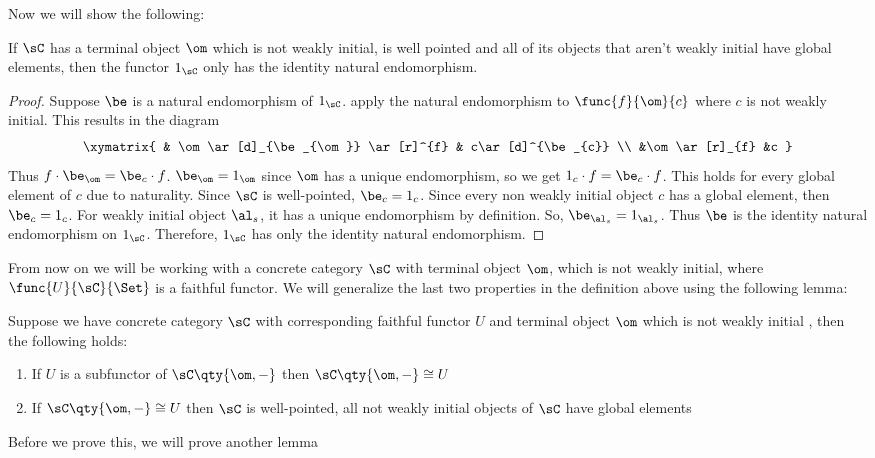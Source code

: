 \documentclass[main.tex]{subfiles}
\begin{document}
Now we will show the following:

\begin{lemma}
	If $\sC$ has a terminal object $\om$ which is not weakly initial, is well
	pointed and all of its  objects that aren't weakly initial have global
	elements, then the functor $1_{\sC}$ only has the identity natural
	endomorphism.
\end{lemma}

\begin{proof}
	Suppose $\be$ is a natural endomorphism of $1_{\sC}$. apply the natural
	endomorphism to $\func{f}{\om}{c}$ where $c$ is  not weakly initial. This
	results in the diagram $$\xymatrix{ & \om \ar[d]_{\be_{\om}} \ar[r]^{f} &
	c\ar[d]^{\be_{c}}  \\   &\om \ar[r]_{f} &c  } $$ Thus $f \cdot \be_{\om} =
	\be_{c} \cdot f$. $\be_{\om} = 1_{\om}$ since $\om$ has a unique
	endomorphism, so we get $1_{c} \cdot f  = \be_{c} \cdot f$. This holds for
	every global element of $c$ due to naturality. Since $\sC$ is well-pointed,
	$\be_{c} = 1_{c}$. Since every non weakly initial object $c$ has a global
	element, then $\be_{c} = 1_{c}$. For weakly initial object $\al_{s}$, it has
	a unique endomorphism by definition. So, $\be_{\al_{s}} = 1_{\al_{s}}$. Thus
	$\be$ is the identity natural endomorphism on $1_{\sC}$. Therefore,
	$1_{\sC}$ has only the identity natural endomorphism.
\end{proof}

From now on we will be working with a concrete category $\sC$ with terminal
object $\om$, which is not weakly initial, where $\func{U}{\sC}{\Set}$ is a
faithful functor. We will generalize the last two properties in the definition
above using the following lemma:

\begin{lemma}
	Suppose we have concrete category $\sC$ with corresponding faithful functor
	$U$ and terminal object $\om$ which is not weakly initial , then the
	following holds:
	\begin{enumerate}
		\item If $U$ is a subfunctor of $\sC\qty{\om,-}$ then $\sC\qty{\om,-} \cong U$
		\item If $\sC\qty{\om,-} \cong U$ then $\sC$ is well-pointed, all not
			weakly initial objects of $\sC$ have global elements
	\end{enumerate}
\end{lemma}

Before we prove this, we will prove another lemma
\end{document}
